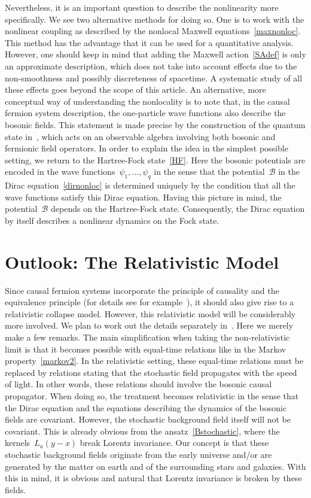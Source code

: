 \documentclass[reqno,11pt]{amsart}
\numberwithin{equation}{section}
\newcommand{\1}{\mathds{1}}
\newcommand{\B}{{\mathscr{B}}}
\begin{document}
{Nevertheless, it is an important question to describe the nonlinearity more specifically.
We see two alternative methods for doing so. One is to work with the nonlinear coupling as described
by the nonlocal Maxwell equations~\eqref{maxnonloc}. This method has the advantage that it can be
used for a quantitative analysis. However, one should keep in mind that adding the Maxwell action~\eqref{SAdef}
is only an approximate description, which does not take into account effects due to the non-smoothness
and possibly discreteness of spacetime. A systematic study of all these effects goes beyond the scope of this
article. An alternative, more conceptual way of understanding the nonlocality is to note that, in the
causal fermion system description, the one-particle wave functions also describe the bosonic fields.
This statement is made precise by the construction of the quantum state in~\cite{fockbosonic},
which acts on an observable algebra involving both bosonic and fermionic field operators.
In order to explain the idea in the simplest possible setting, we return to the Hartree-Fock state~\eqref{HF}.
Here the bosonic potentials are encoded in the wave functions~$\psi_1, \ldots, \psi_q$ in the sense that
the potential~$\B$ in the Dirac equation~\eqref{dirnonloc} is determined uniquely by the condition that all the
wave functions satisfy this Dirac equation.
Having this picture in mind, the potential~$\B$ depends on the Hartree-Fock state. Consequently,
the Dirac equation by itself describes a nonlinear dynamics on the Fock state.

\section{Outlook: The Relativistic Model} \label{secrelativity}
Since causal fermion systems incorporate the principle of causality and the equivalence principle
(for details see for example~\cite[Section~5.9]{intro}), it should also give rise to a relativistic collapse model.
However, this relativistic model will be considerably more involved. We plan to work out the
details separately in~\cite{relcoll}. Here we merely make a few remarks.
The main simplification when taking the non-relativistic limit is that it becomes possible with
equal-time relations like in the Markov property~\eqref{markov2}.
In the relativistic setting, these equal-time relations must be replaced by relations stating that
the stochastic field propagates with the speed of light. In other words, these relations should involve
the bosonic causal propagator.
When doing so, the treatment becomes relativistic in the sense that the Dirac equation
and the equations describing the dynamics of the bosonic fields are covariant.
However, the stochastic background field itself will not be covariant.
This is already obvious from the ansatz~\eqref{Bstochastic}, where the kernels~$L_a(y-x)$
break Lorentz invariance.
Our concept is that these stochastic background fields originate from the early universe
and/or are generated by the matter on earth and of the surrounding stars and galaxies.
With this in mind, it is obvious and natural that Lorentz invariance is broken by these fields.

}
\end{document}
